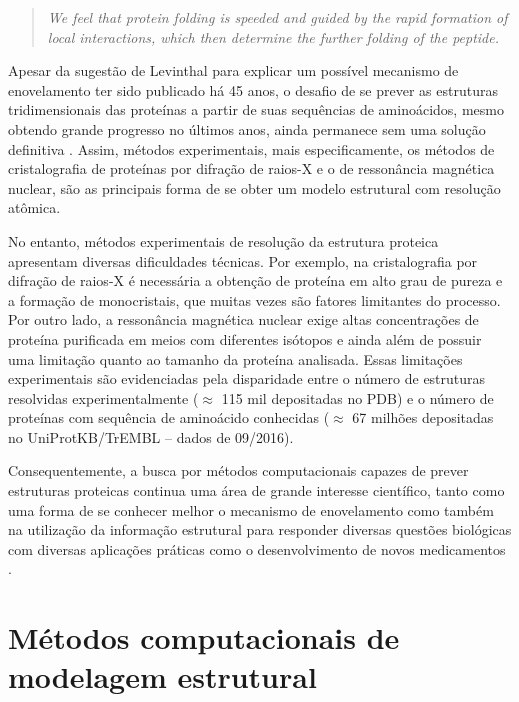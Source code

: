 \begin{quote}
\textit{We feel that protein folding is speeded and guided by the rapid formation of local interactions, which then determine the further folding of the peptide.}
\end{quote}

Apesar da sugestão de Levinthal para explicar um possível mecanismo de enovelamento ter sido publicado há 45 anos, o desafio de se prever as estruturas tridimensionais das proteínas a partir de suas sequências de aminoácidos, mesmo obtendo grande progresso no últimos anos, ainda permanece sem uma solução definitiva \cite{Moult2014}. Assim, métodos experimentais, mais especificamente, os métodos de cristalografia de proteínas por difração de raios-X e o de ressonância magnética nuclear, são as principais forma de se obter um modelo estrutural com resolução atômica. 

No entanto, métodos experimentais de resolução da estrutura proteica apresentam diversas dificuldades técnicas. Por exemplo, na cristalografia por difração de raios-X é necessária a obtenção de proteína em alto grau de pureza e a formação de monocristais, que muitas vezes são fatores limitantes do processo. Por outro lado, a ressonância magnética nuclear exige altas concentrações de proteína purificada em meios com diferentes isótopos e ainda além de possuir uma limitação quanto ao tamanho da proteína analisada. Essas limitações experimentais são evidenciadas pela disparidade entre o número de estruturas resolvidas experimentalmente ($\approx$ 115 mil depositadas no PDB) e o número de proteínas com sequência de aminoácido conhecidas ($\approx$ 67 milhões depositadas no UniProtKB/TrEMBL – dados de 09/2016). 

Consequentemente, a busca por métodos computacionais capazes de prever estruturas proteicas continua uma área de grande interesse científico, tanto como uma forma de se conhecer melhor o mecanismo de enovelamento como também na utilização da informação estrutural para responder diversas questões biológicas com diversas aplicações práticas como o desenvolvimento de novos medicamentos \cite{Baker2001}.

\section{Métodos computacionais de modelagem estrutural}

